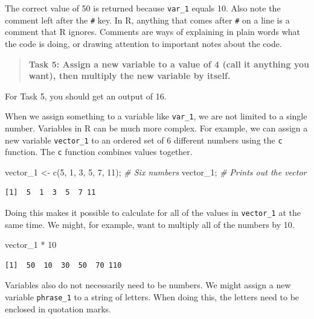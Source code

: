 \documentclass[
]{scrbook}
\newenvironment{Shaded}{\begin{snugshade}}{\end{snugshade}}
\newcommand{\CommentTok}[1]{\textcolor[rgb]{0.56,0.35,0.01}{\textit{#1}}}
\newcommand{\DecValTok}[1]{\textcolor[rgb]{0.00,0.00,0.81}{#1}}
\newcommand{\FunctionTok}[1]{\textcolor[rgb]{0.00,0.00,0.00}{#1}}
\newcommand{\NormalTok}[1]{#1}
\newcommand{\OtherTok}[1]{\textcolor[rgb]{0.56,0.35,0.01}{#1}}
\newcommand{\SpecialCharTok}[1]{\textcolor[rgb]{0.00,0.00,0.00}{#1}}
\begin{document}
The correct value of 50 is returned because \texttt{var\_1} equals 10. Also note the comment left after the \texttt{\#} key.
In R, anything that comes after \texttt{\#} on a line is a comment that R ignores.
Comments are ways of explaining in plain words what the code is doing, or drawing attention to important notes about the code.

\begin{quote}
\textbf{Task 5: Assign a new variable to a value of 4 (call it anything you want), then multiply the new variable by itself.}
\end{quote}

For Task 5, you should get an output of 16.

When we assign something to a variable like \texttt{var\_1}, we are not limited to a single number.
Variables in R can be much more complex.
For example, we can assign a new variable \texttt{vector\_1} to an ordered set of 6 different numbers using the \texttt{c} function.
The \texttt{c} function combines values together.

\begin{Shaded}
\begin{Highlighting}[]
\NormalTok{vector\_1 }\OtherTok{\textless{}{-}} \FunctionTok{c}\NormalTok{(}\DecValTok{5}\NormalTok{, }\DecValTok{1}\NormalTok{, }\DecValTok{3}\NormalTok{, }\DecValTok{5}\NormalTok{, }\DecValTok{7}\NormalTok{, }\DecValTok{11}\NormalTok{); }\CommentTok{\# Six numbers}
\NormalTok{vector\_1;      }\CommentTok{\# Prints out the vector}
\end{Highlighting}
\end{Shaded}

\begin{verbatim}
[1]  5  1  3  5  7 11
\end{verbatim}

Doing this makes it possible to calculate for all of the values in \texttt{vector\_1} at the same time.
We might, for example, want to multiply all of the numbers by 10.

\begin{Shaded}
\begin{Highlighting}[]
\NormalTok{vector\_1 }\SpecialCharTok{*} \DecValTok{10}
\end{Highlighting}
\end{Shaded}

\begin{verbatim}
[1]  50  10  30  50  70 110
\end{verbatim}

Variables also do not necessarily need to be numbers.
We might assign a new variable \texttt{phrase\_1} to a string of letters.
When doing this, the letters need to be enclosed in quotation marks.
\end{document}
